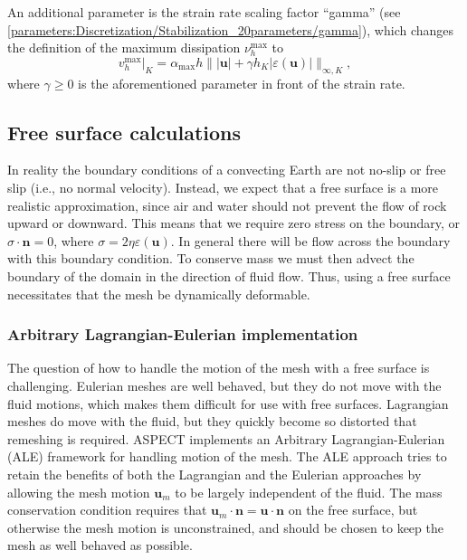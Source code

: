\documentclass{article}
\newcommand{\aspect}{\textsc{ASPECT}}
\begin{document}
An additional parameter is the strain rate scaling factor ``gamma'' (see \ref{parameters:Discretization/Stabilization_20parameters/gamma}), which changes the definition
of the maximum dissipation $\nu_h^\text{max}$ to
\[
 v_h^\text{max} \vert_K = \alpha_\text{max} h \|\lvert\mathbf u\rvert + \gamma h_K \lvert\varepsilon (\mathbf u)\rvert\|_{\infty,K},
\]
where $\gamma\geq 0$ is the aforementioned parameter in front of the strain rate.

\subsection{Free surface calculations}
\label{sec:freesurface}

In reality the boundary conditions of a convecting Earth are not no-slip or 
free slip (i.e., no normal velocity).  Instead, we expect that a free surface
is a more realistic approximation, since air and water should not prevent the
flow of rock upward or downward.  This means that we require zero stress on the 
boundary, or $\sigma \cdot \textbf{n} = 0$, where $\sigma = 2 \eta \varepsilon (\textbf{u})$. 
In general there will be flow across the boundary with this boundary condition.  
To conserve mass we must then advect the boundary of the domain in the direction 
of fluid flow.  Thus, using a free surface necessitates that the mesh be dynamically deformable.  

\subsubsection{Arbitrary Lagrangian-Eulerian implementation}

The question of how to handle the motion of the mesh with a free surface is
challenging.  Eulerian meshes are well behaved, but they do not move with the 
fluid motions, which makes them difficult for use with free surfaces. 
Lagrangian meshes do move with the fluid, but they quickly become so 
distorted that remeshing is required. \aspect{} implements an Arbitrary 
Lagrangian-Eulerian (ALE) framework for handling motion of the mesh.  The ALE 
approach tries to retain the benefits of both the Lagrangian and the Eulerian
approaches by allowing the mesh motion $\textbf{u}_m$ to be largely independent of 
the fluid. The mass conservation condition requires that 
$\textbf{u}_m \cdot \textbf{n} = \textbf{u} \cdot \textbf{n}$ on the free 
surface, but otherwise the mesh motion is unconstrained, and should be chosen
to keep the mesh as well behaved as possible.
\end{document}

